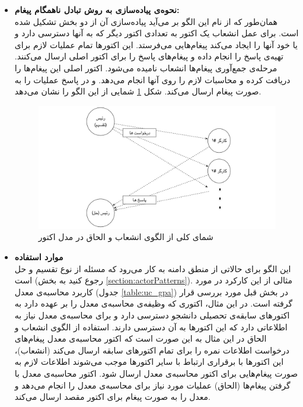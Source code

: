 \begin{itemize}
\item\textbf{نحوه‌ی پیاده‌سازی به روش تبادل ناهمگام پیغام:}\\
همان‌طور که از نام این الگو بر می‌آید پیاده‌سازی آن از دو بخش تشکیل شده است. برای عمل انشعاب یک اکتور به تعدادی اکتور دیگر که به آنها دسترسی دارد و یا خود آنها را ایجاد می‌کند پیغام‌هایی می‌فرستد. این اکتورها تمام عملیات لازم برای تهیه‌ی پاسخ را انجام داده و پیغام‌های پاسخ را برای اکتور اصلی ارسال می‌کنند. مرحله‌ی جمع‌آوری پیغام‌ها انشعاب نامیده می‌شود. اکتور اصلی این پیغام‌‌ها را دریافت کرده و محاسبات لازم را روی آنها انجام می‌دهد. و در پاسخ عملیات را به صورت پیغام ارسال می‌کند.‍ شکل \ref{fig:fork_and_join} شمایی از این الگو را نشان می‌دهد.
\begin{figure}
    \begin{center}
	\includegraphics[width=16cm]{3-RelatedWork/Figures/Divide_and_Conquer.pdf}
    \end{center}
    \caption{\label{fig:fork_and_join}  شمای کلی از الگوی انشعاب و الحاق در مدل اکتور }
\end{figure}

\item\textbf{موارد استفاده}\\
این الگو برای حالاتی از منطق دامنه به کار می‌رود که مسئله از نوع تقسیم و حل است (رجوع کنید به بخش \ref{section:actorPatterns}). مثالی از این کارکرد در مورد کاربرد محاسبه‌ی معدل (جدول \ref{table:uc_gpa}) در بخش قبل مورد بررسی قرار گرفته است. در این مثال، اکتوری که وظیفه‌ی محاسبه‌ی معدل را بر عهده دارد به اکتورهای سابقه‌ی تحصیلی دانشجو دسترسی دارد و برای محاسبه‌ی معدل نیاز به اطلاعاتی دارد که این اکتورها به آن دسترسی دارند. استفاده از الگوی انشعاب و الحاق در این مثال به این صورت است که اکتور محاسبه‌ی معدل پیغام‌های درخواست اطلاعات نمره را برای تمام اکتورهای سابقه ارسال می‌کند (انشعاب)، این اکتورها با برقراری ارتباط با سایر اکتورها موجب می‌شوند اطلاعات لازم به صورت پیغام‌هایی برای اکتور محاسبه‌ی معدل ارسال شود. اکتور محاسبه‌ی معدل با گرفتن پیغام‌ها (الحاق) عملیات مورد نیاز برای محاسبه‌ی معدل را انجام‌ می‌دهد و معدل را به صورت پیغام برای اکتور مقصد ارسال می‌کند.


\end{itemize}
